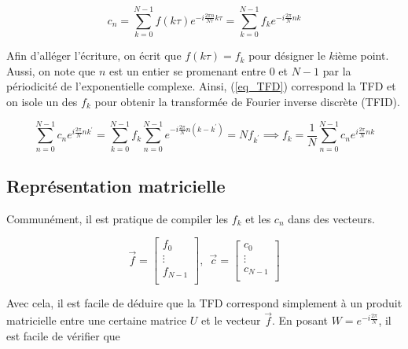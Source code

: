 \begin{equation}
    c_n = \sum_{k=0}^{N-1}f(k\tau)e^{-i\frac{2\pi n}{N\tau}k\tau} = \sum_{k=0}^{N-1}f_ke^{-i\frac{2\pi}{N}nk}
    \label{eq_TFD}
\end{equation}

Afin d'alléger l'écriture, on écrit que $f(k\tau) = f_k$ pour désigner le $k$ième point. Aussi, on note que $n$ est un entier se promenant entre 0 et $N-1$ par la périodicité de l'exponentielle complexe. Ainsi, (\ref{eq_TFD}) correspond la TFD et on isole un des $f_k$ pour obtenir la transformée de Fourier inverse discrète (TFID).

\begin{equation}
    \sum_{n=0}^{N-1}c_n e^{i\frac{2\pi}{N}nk^{'}} = \sum_{k=0}^{N-1}f_k\sum_{n=0}^{N-1} e^{-i\frac{2\pi}{N}n(k-k^{'})} = Nf_{k^{'}} \implies f_k = \frac{1}{N}\sum_{n=0}^{N-1}c_n e^{i\frac{2\pi}{N}nk}
    \label{eq_TFID}
\end{equation}

\subsection{Représentation matricielle}
Communément, il est pratique de compiler les $f_k$ et les $c_n$ dans des vecteurs.

\begin{equation*}
    \vec{f} = 
    \begin{bmatrix}
        f_0 \\
        \vdots \\
        f_{N-1} \\
    \end{bmatrix}, \ \
    \vec{c} = 
    \begin{bmatrix}
        c_0 \\
        \vdots \\
        c_{N-1} \\
    \end{bmatrix}
\end{equation*}

Avec cela, il est facile de déduire que la TFD correspond simplement à un produit matricielle entre une certaine matrice $U$ et le vecteur $\vec{f}$. En posant $W = e^{-i\frac{2\pi}{N}}$, il est facile de vérifier que 

